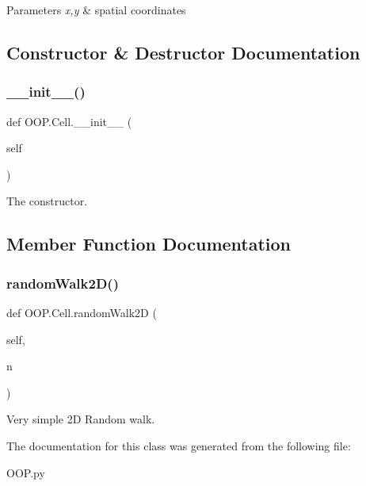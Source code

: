 \begin{DoxyParams}{Parameters}
{\em x,y} & spatial coordinates \\
\hline
\end{DoxyParams}


\subsection{Constructor \& Destructor Documentation}
\mbox{\label{class_o_o_p_1_1_cell_ab1a324a4456c36a49868ba26cd76eb39}} 
\subsubsection{\texorpdfstring{\+\_\+\+\_\+init\+\_\+\+\_\+()}{\_\_init\_\_()}}
{\footnotesize\ttfamily def O\+O\+P.\+Cell.\+\_\+\+\_\+init\+\_\+\+\_\+ (\begin{DoxyParamCaption}\item[{}]{self }\end{DoxyParamCaption})}



The constructor. 



\subsection{Member Function Documentation}
\mbox{\label{class_o_o_p_1_1_cell_a43bf87982f526ebdcf3334ab9d9038fd}} 
\subsubsection{\texorpdfstring{random\+Walk2\+D()}{randomWalk2D()}}
{\footnotesize\ttfamily def O\+O\+P.\+Cell.\+random\+Walk2D (\begin{DoxyParamCaption}\item[{}]{self,  }\item[{}]{n }\end{DoxyParamCaption})}



Very simple 2D Random walk. 



The documentation for this class was generated from the following file\+:\begin{DoxyCompactItemize}
\item 
O\+O\+P.\+py\end{DoxyCompactItemize}

